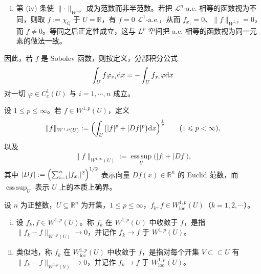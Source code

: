 \documentclass[../../main.tex]{subfiles}%
\begin{document}
\begin{remark}
\begin{enumerate}[(i)]
\item 第 (iv) 条使 $\lVert\cdot\rVert_{W^{1,p}}$ 成为范数而非半范数。若把 $\mathcal{L}^{n}$-a.e. 相等的函数视为不同，则取 $f:=\chi_{\mathbb{Q}}$ 于 $U=\mathbb{R}$，有 $f=0$ $\mathcal{L}^{1}$-a.e.，从而 $f_{x_1}=0$、$\lVert f\rVert_{W^{1,p}}=0$，而 $f\neq0$。等同之后正定性成立，这与 $L^{p}$ 空间把 a.e. 相等的函数视为同一元素的做法一致。
\end{enumerate}
\end{remark}

\begin{remark}\label{remark:ch04-def-4-2-分部积分}
因此，若 $f$ 是 Sobolev 函数，则按定义，分部积分公式
\begin{align*}
\int_{U}f\varphi_{x_i}\mathrm{d} x=-\int_{U}f_{x_i}\varphi\mathrm{d} x
\end{align*}
对一切 $\varphi\in C_c^{1}(U)$ 与 $i=1,\cdots,n$ 成立。
\end{remark}

\begin{remark}\label{remark:ch04-def-4-2-范数}
设 $1\leqslant p\leqslant\infty$。若 $f\in W^{1,p}(U)$，定义
\begin{align*}
\lVert f\rVert_{W^{1,p}(U)}:=\Bigl(\int_{U}\bigl(\lvert f\rvert^{p}+\lvert Df\rvert^{p}\bigr)\mathrm{d} x\Bigr)^{\frac{1}{p}}\qquad(1\leqslant p<\infty),
\end{align*}
以及
\begin{align*}
\lVert f\rVert_{W^{1,\infty}(U)}:=\operatorname*{ess\,sup}_{U}\bigl(\lvert f\rvert+\lvert Df\rvert\bigr),
\end{align*}
其中 $\lvert Df\rvert:=\Bigl(\sum_{i=1}^{n}\lvert f_{x_i}\rvert^{2}\Bigr)^{1/2}$ 表示向量 $Df(x)\in\mathbb{R}^{n}$ 的 Euclid 范数，而 $\operatorname*{ess\,sup}_{U}$ 表示 $U$ 上的本质上确界。
\end{remark}

\begin{definition}\label{definition:ch04-4-3}
设 $n$ 为正整数，$U\subseteq\mathbb{R}^{n}$ 为开集，$1\leqslant p\leqslant\infty$，$f_k,f\in W^{1,p}_{\mathrm{loc}}(U)$（$k=1,2,\cdots$）。
\begin{enumerate}[(i)]
\item 设 $f_k,f\in W^{1,p}(U)$。称 $f_k$ 在 $W^{1,p}(U)$ 中收敛于 $f$，是指 $\lVert f_k-f\rVert_{W^{1,p}(U)}\to0$，并记作 $f_k\to f$ 于 $W^{1,p}(U)$。
\item 类似地，称 $f_k$ 在 $W^{1,p}_{\mathrm{loc}}(U)$ 中收敛于 $f$，是指对每个开集 $V\subset\subset U$ 有 $\lVert f_k-f\rVert_{W^{1,p}(V)}\to0$，并记作 $f_k\to f$ 于 $W^{1,p}_{\mathrm{loc}}(U)$。
\end{enumerate}
\end{definition}
\end{document}
